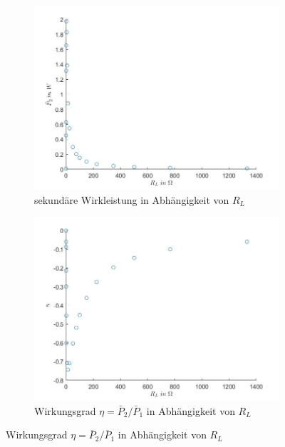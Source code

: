 \documentclass[a4paper, 12pt,]{scrartcl}
\begin{document}
\begin{figure}[H]\centering
\begin{adjustwidth}{-1em}{7em}
  \begin{subfigure}[b]{0.5\textwidth}
    \includegraphics[width=\textwidth]{RLP2}
    \caption{sekundäre Wirkleistung in Abhängigkeit von $R_L$}
    \label{fig:}
  \end{subfigure}
  \begin{subfigure}[b]{0.5\textwidth}
    \includegraphics[width=\textwidth]{RLn}
    \caption{Wirkungsgrad $\eta=\bar{P}_2/\bar{P}_1$ in Abhängigkeit von $R_L$}
    \label{fig:}
  \end{subfigure}
\end{adjustwidth}\centering
\end{figure}
\end{document}
